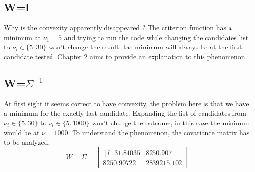 \subsection{W=I}
Why is the convexity apparently disappeared ? The criterion function has a minimum at $\nu_1=5$ and trying to run the code while changing the candidates list to $\nu_i \in \{5:30\}$ won't change the result: the minimum will always be at the first candidate tested. Chapter 2 aims to provide an explanation to this phenomenon.

\subsection{W=$\Sigma^{-1}$}
At first sight it seems correct to have convexity, the problem here is that we have a minimum for the exactly last candidate. Expanding the list of candidates from $\nu_i \in \{5:30\}$ to $\nu_i \in \{5:1000\}$ won't change the outcome, in this case the minimum would be at $\nu=1000$. To understand the phenomenon, the covariance matrix has to be analyzed.
\begin{equation*}
    W=\Sigma=
    \begin{bmatrix}[l]
        31.84035    &8250.907 \\
        8250.90722  &2839215.102
        \end{bmatrix}
\end{equation*}





\newpage

